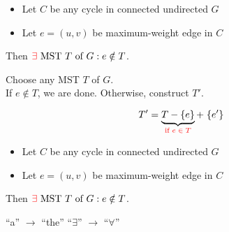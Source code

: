 
\begin{frame}{}
  \begin{theorem}
    \begin{itemize}
      \item Let $C$ be any cycle in connected undirected $G$
      \item Let $e = (u,v)$ be  maximum-weight edge in $C$
    \end{itemize}

    \begin{center}
      {Then $\textcolor{red}{\exists} \text{ MST } T \text{ of } G: e \notin T$.}
    \end{center}
  \end{theorem}

  \pause
  \begin{center}
    Choose any MST $T$ of $G$. \pause \\[3pt]
    If $e \notin T$, we are done. Otherwise, construct $T'$.
  \end{center}

  \pause

  \pause
  \vspace{-0.30cm}
  \[
    T' = \underbrace{T - \{e\}}_{\textcolor{red}{\text{if } e \;\in\; T}} +\; \{e'\}
  \]
\end{frame}

\begin{frame}{}
  \begin{theorem}
    \begin{itemize}
      \item Let $C$ be any cycle in connected undirected $G$
      \item Let $e = (u,v)$ be  maximum-weight edge in $C$
    \end{itemize}

    \begin{center}
      {Then $\textcolor{red}{\exists} \text{ MST } T \text{ of } G: e \notin T$.}
    \end{center}
  \end{theorem}

  \pause
  \vspace{0.30cm}
  \begin{center}
    {``a'' $\to$ ``the'' \red{$\implies$} ``$\exists$'' $\to$ ``$\forall$''}
  \end{center}
\end{frame}

